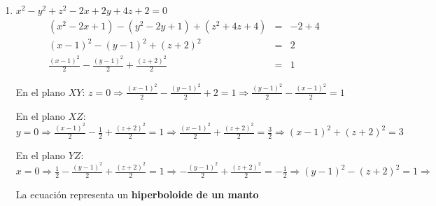 \documentclass{article}
\begin{document}
\begin{enumerate}
{\begin{enumerate}
{\begin{center}
                        \end{center}
                        La ecuación representa un {\bf paraboloide hiperbólico}
                        \begin{center}
                        \end{center}
                    }
                    \color{negro}
                    \item{
                        $x^2-y^2+z^2-2x+2y+4z+2=0$
                        \color{azul}
                        \begin{eqnarray*}
                            (x^2-2x+1)-(y^2-2y+1)+(z^2+4z+4) & = & -2+4\\
                            (x-1)^2-(y-1)^2+(z+2)^2          & = & 2\\[.3cm]
                            \frac{(x-1)^2}{2}-\frac{(y-1)^2}{2}+\frac{(z+2)^2}{2}
                            & = & 1
                        \end{eqnarray*}
                        
                        En el plano $XY$:
                        \(
                            z=0 \Rightarrow
                            \frac{(x-1)^2}{2}-\frac{(y-1)^2}{2}+2=1\Rightarrow
                            \frac{(y-1)^2}{2}-\frac{(x-1)^2}{2}=1
                        \)
                        \begin{center}
                        \end{center}
                        En el plano $XZ$:
                        \(
                            y=0\Rightarrow
                            \frac{(x-1)^2}{2}-\frac{1}{2}+\frac{(z+2)^2}{2}=1\Rightarrow
                            \frac{(x-1)^2}{2}+\frac{(z+2)^2}{2}=\frac{3}{2}\Rightarrow
                            (x-1)^2+(z+2)^2=3
                        \)
                        \begin{center}
                        \end{center}
                        En el plano $YZ$:
                        \(
                            x=0 \Rightarrow
                            \frac{1}{2}-\frac{(y-1)^2}{2}+\frac{(z+2)^2}{2}=1\Rightarrow
                            -\frac{(y-1)^2}{2}+\frac{(z+2)^2}{2}=-\frac{1}{2}\Rightarrow
                            (y-1)^2-(z+2)^2=1\Rightarrow
                        \)
                        \begin{center}
                        \end{center}
                        La ecuación representa un {\bf hiperboloide de un manto}
                        \begin{center}
                        \end{center}
                    }
                \end{enumerate}
            }
        \end{enumerate}
    
\end{document}
